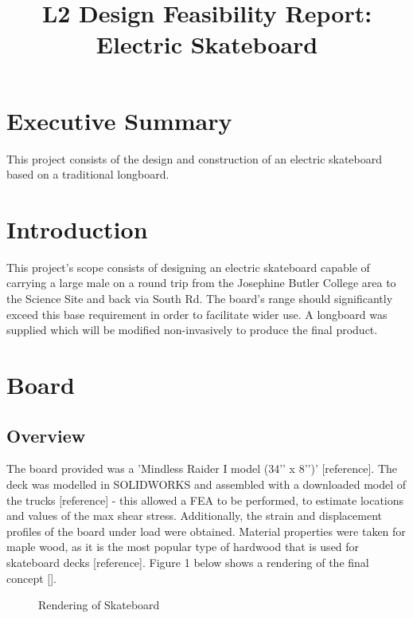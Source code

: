 \documentclass[journal,10pt]{IEEEtran}
\title{ 
\begin{huge}
\textbf{L2 Design Feasibility Report: Electric Skateboard} 
\end{huge} }
\begin{document}
\maketitle
\section{Executive Summary}
        This project consists of the design and construction of an electric skateboard based on a traditional longboard.
    
\section{Introduction}
        This project's scope consists of designing an electric skateboard capable of carrying a large male on a round trip from the Josephine Butler College area to the Science Site and back via South Rd. The board's range should significantly exceed this base requirement in order to facilitate wider use. A longboard was supplied which will be modified non-invasively to produce the final product. 
\section{Board}
    \subsection{Overview}
        The board provided was a 'Mindless Raider I model (34’’ x 8’’)’  [reference]. The deck was modelled in SOLIDWORKS and assembled with a downloaded model of the trucks [reference] - this allowed a FEA to be performed, to estimate locations and values of the max shear stress. Additionally, the strain and displacement profiles of the board under load were obtained. Material properties were taken for maple wood, as it is the most popular type of hardwood that is used for skateboard decks [reference]. Figure 1 below shows a rendering of the final concept []. 
        \begin{figure}[H]
                \centering
                \caption{
                Rendering of Skateboard}
                \label{fig:Board_Rendering}
            \end{figure} 
\end{document}
